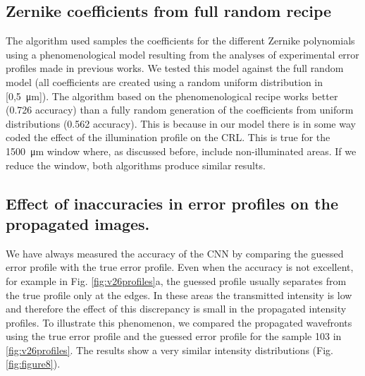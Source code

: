 \documentclass[preprint]{iucr}
\begin{document}
\subsection{Zernike coefficients from full random recipe}
The algorithm used samples the coefficients for the different Zernike polynomials using a phenomenological model resulting from the analyses of experimental error profiles made in previous works. We tested this model against the full random model (all  coefficients are created using a random uniform distribution in [0,\SI{5}{\micro\meter}]). The algorithm based on the phenomenological recipe works better (0.726 accuracy) than a fully random generation of the coefficients from uniform distributions (0.562 accuracy). This is because in our model there is in some way coded the effect of the illumination profile on the CRL. This is true for the \SI{1500}{\micro\meter} window where, as discussed before, include non-illuminated areas. If we reduce the window, both algorithms produce similar results. 

\subsection{Effect of inaccuracies in error profiles on the propagated images.}
We have always measured the accuracy of the CNN by comparing the guessed error profile with the true error profile. Even when the accuracy is not excellent, for example in Fig. \ref{fig:v26profiles}a, the guessed profile usually separates from the true profile only at the edges. In these areas the transmitted intensity is low and therefore the effect of this discrepancy is small in the propagated intensity profiles. To illustrate this phenomenon, we compared the propagated wavefronts using the true error profile and the guessed error profile for the sample 103 in \ref{fig:v26profiles}. The results show a very similar intensity distributions (Fig. \ref{fig:figure8}).
\end{document}
